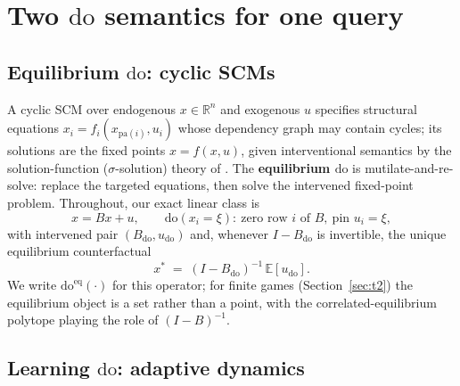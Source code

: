 \documentclass[pmlr]{jmlr}
\newcommand{\R}{\mathbb{R}}
\newcommand{\E}{\mathbb{E}}
\newcommand{\doop}{\mathrm{do}}
\newcommand{\doeq}[1]{\doop^{\mathrm{eq}}(#1)}
\begin{document}
\section{Two \texorpdfstring{$\doop$}{do} semantics for one query}\label{sec:setup}

\subsection{Equilibrium \texorpdfstring{$\doop$}{do}: cyclic SCMs}\label{sec:eqdo}

A cyclic SCM over endogenous $x \in \R^n$ and exogenous $u$ specifies structural equations
$x_i = f_i(x_{\mathrm{pa}(i)}, u_i)$ whose dependency graph may contain cycles; its solutions
are the fixed points $x = f(x, u)$, given interventional semantics by the solution-function
($\sigma$-solution) theory of \citet{bongers2021foundations}. The \textbf{equilibrium $\doop$}
is mutilate-and-re-solve: replace the targeted equations, then solve the intervened fixed-point
problem. Throughout, our exact linear class is
\begin{equation}\label{eq:linear-scm}
x = Bx + u, \qquad
\doop(x_i{=}\xi):\ \text{zero row } i \text{ of } B,\ \text{pin } u_i = \xi,
\end{equation}
with intervened pair $(B_{\doop}, u_{\doop})$ and, whenever $I - B_{\doop}$ is invertible, the
unique equilibrium counterfactual
\begin{equation}\label{eq:xstar}
x^* \;=\; (I - B_{\doop})^{-1}\, \E[u_{\doop}].
\end{equation}
We write $\doeq{\cdot}$ for this operator; for finite games (Section~\ref{sec:t2}) the
equilibrium object is a set rather than a point, with the correlated-equilibrium polytope
playing the role of $(I-B)^{-1}$.

\subsection{Learning \texorpdfstring{$\doop$}{do}: adaptive dynamics}\label{sec:lrdo}
\end{document}
